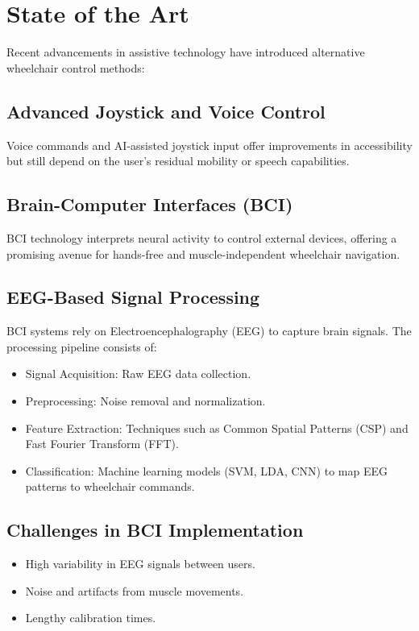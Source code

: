 \documentclass[a4paper]{article}
\begin{document}
\section{State of the Art}

Recent advancements in assistive technology have introduced alternative wheelchair control methods:

\subsection{Advanced Joystick and Voice Control}
Voice commands and AI-assisted joystick input offer improvements in accessibility but still depend on the user's residual mobility or speech capabilities.

\subsection{Brain-Computer Interfaces (BCI)}
BCI technology interprets neural activity to control external devices, offering a promising avenue for hands-free and muscle-independent wheelchair navigation.

\subsection{EEG-Based Signal Processing}
BCI systems rely on Electroencephalography (EEG) to capture brain signals. The processing pipeline consists of:
\begin{itemize}
    \item Signal Acquisition: Raw EEG data collection.
    \item Preprocessing: Noise removal and normalization.
    \item Feature Extraction: Techniques such as Common Spatial Patterns (CSP) and Fast Fourier Transform (FFT).
    \item Classification: Machine learning models (SVM, LDA, CNN) to map EEG patterns to wheelchair commands.
\end{itemize}

\subsection{Challenges in BCI Implementation}
\begin{itemize}
    \item High variability in EEG signals between users.
    \item Noise and artifacts from muscle movements.
    \item Lengthy calibration times.
\end{itemize}
\end{document}
